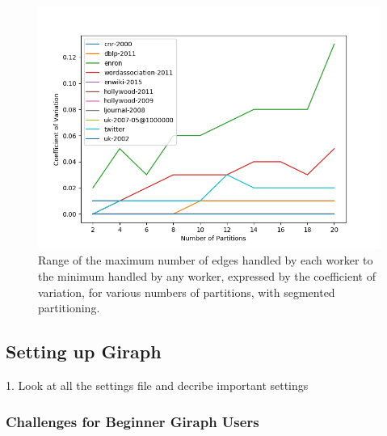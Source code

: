 \begin{figure}
	\centering
	\includegraphics[width=\columnwidth]{../good_plots/range_as_cv_modulo.png}
	\caption{Range of the maximum number of edges handled by each worker to the 
		minimum handled by any worker, expressed by the coefficient of 
		variation, for various numbers of partitions, with segmented 
		partitioning.}
	\label{fig:cv_range}
\end{figure}



\subsection{Setting up Giraph}
1. Look at all the settings file and decribe important settings 


\subsubsection{Challenges for Beginner Giraph Users}

